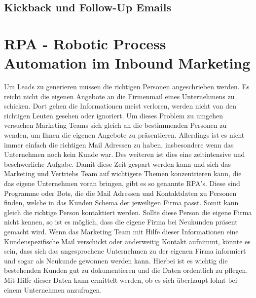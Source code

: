 \subsection{Kickback und Follow-Up Emails}



\section{RPA - Robotic Process Automation im Inbound Marketing}
Um Leads zu generieren müssen die richtigen Personen angeschrieben werden. Es reicht nicht die eigenen Angebote an die Firmenmail eines Unternehmens zu schicken. Dort gehen die Informationen meist verloren, werden nicht von den richtigen Leuten gesehen oder ignoriert. Um dieses Problem zu umgehen versuchen Marketing Teams sich gleich an die bestimmenden Personen zu wenden, um Ihnen die eigenen Angebote zu präsentieren. Allerdings ist es nicht immer einfach die richtigen Mail Adressen zu haben, insbesondere wenn das Unternehmen noch kein Kunde war. Des weiteren ist dies eine zeitintensive und beschwerliche Aufgabe. 
\newline 
Damit diese Zeit gespart werden kann und sich das Marketing und Vertriebs Team auf wichtigere Themen konzentrieren kann, die das eigene Unternehmen voran bringen, gibt es so genannte RPA's. Diese sind Programme oder Bots, die die Mail Adressen und Kontaktdaten zu Personen finden, welche in das Kunden Schema der jeweiligen Firma passt. Somit kann gleich die richtige Person kontaktiert werden. Sollte diese Person die eigene Firma nicht kennen, so ist es möglich, dass die eigene Firma bei Neukunden präsent gemacht wird. Wenn das Marketing Team mit Hilfe dieser Informationen eine Kundenspezifische Mail verschickt oder anderweitig Kontakt aufnimmt, könnte es sein, dass sich das angesprochene Unternehmen zu der eigenen Firma informiert und sogar als Neukunde gewonnen werden kann. 
\newline 
Hierbei ist es wichtig die bestehenden Kunden gut zu dokumentieren und die Daten ordentlich zu pflegen. Mit Hilfe dieser Daten kann ermittelt werden, ob es sich überhaupt lohnt bei einem Unternehmen anzufragen. 	